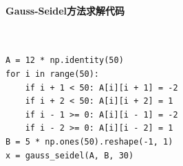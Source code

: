 \paragraph{Gauss-Seidel方法求解代码}
~\\
\begin{verbatim}
A = 12 * np.identity(50)
for i in range(50):
    if i + 1 < 50: A[i][i + 1] = -2
    if i + 2 < 50: A[i][i + 2] = 1
    if i - 1 >= 0: A[i][i - 1] = -2
    if i - 2 >= 0: A[i][i - 2] = 1
B = 5 * np.ones(50).reshape(-1, 1)
x = gauss_seidel(A, B, 30)
\end{verbatim}
